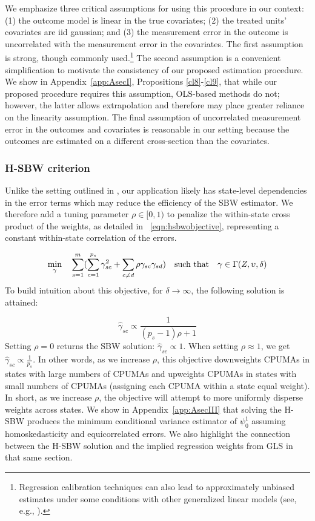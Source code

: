 \documentclass[aoas]{imsart}
\theoremstyle{plain}
\theoremstyle{remark}
\begin{document}
We emphasize three critical assumptions for using this procedure in our context: (1) the outcome model is linear in the true covariates; (2) the treated units' covariates are iid gaussian; and (3) the measurement error in the outcome is uncorrelated with the measurement error in the covariates. The first assumption is strong, though commonly used.\footnote{Regression calibration techniques can also lead to approximately unbiased estimates under some conditions with other generalized linear models (see, e.g., \cite{spiegelman2001efficient}).} The second assumption is a convenient simplification to motivate the consistency of our proposed estimation procedure. We show in Appendix~\ref{app:AsecI}, Propositions \ref{cl8}-\ref{cl9}, that while our proposed procedure requires this assumption, OLS-based methods do not; however, the latter  allows extrapolation and therefore may place greater reliance on the linearity assumption. The final assumption of uncorrelated measurement error in the outcomes and covariates is reasonable in our setting because the outcomes are estimated on a different cross-section than the covariates. 

\subsubsection{H-SBW criterion}\label{sssec:hsbw}

Unlike the setting outlined in \cite{zubizarreta2015stable}, our application likely has state-level dependencies in the error terms which may reduce the efficiency of the SBW estimator. We therefore add a tuning parameter $\rho \in [0, 1)$ to penalize the within-state cross product of the weights, as detailed in ~\eqref{eqn:hsbwobjective}, representing a constant within-state correlation of the errors.

\begin{equation}\label{eqn:hsbwobjective}
\min_{\gamma} \quad \sum_{s=1}^{m}(\sum_{c = 1}^{p_s}\gamma_{sc}^2 + \sum_{c \ne d}\rho \gamma_{sc}\gamma_{sd}) \quad \text{such that} \quad \gamma \in \Gamma(Z, \upsilon, \delta)\\
\end{equation}
To build intuition about this objective, for $\delta \to \infty$, the following solution is attained:

\begin{equation}\label{eqn:sbwsol}
\hat{\gamma}_{sc} \propto \frac{1}{(p_s - 1)\rho + 1}
\end{equation}
Setting $\rho = 0$ returns the SBW solution: $\hat{\gamma}_{sc} \propto 1$. When setting $\rho \approx 1$, we get $\hat{\gamma}_{sc} \propto \frac{1}{p_s}$. In other words, as we increase $\rho$, this objective downweights CPUMAs in states with large numbers of CPUMAs and upweights CPUMAs in states with small numbers of CPUMAs (assigning each CPUMA within a state equal weight). In short, as we increase $\rho$, the objective will attempt to more uniformly disperse weights across states. We show in Appendix~\ref{app:AsecIII} that solving the H-SBW produces the minimum conditional variance estimator of $\psi_0^1$ assuming homoskedasticity and equicorrelated errors. We also highlight the connection between the H-SBW solution and the implied regression weights from GLS in that same section.
\end{document}
